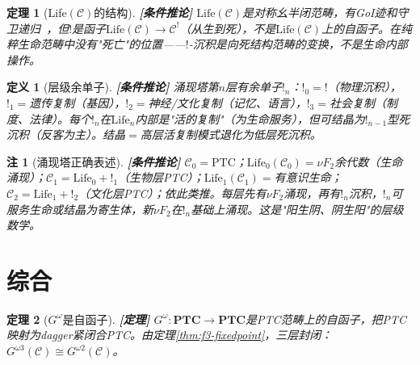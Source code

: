 \documentclass[11pt,a4paper]{article}
\newtheorem{definition}{定义}
\newtheorem{theorem}{定理}
\newtheorem{remark}{注}
\newcommand{\lvl}[1]{\hfill\textbf{\footnotesize[#1]}}
\newcommand{\lvP}{\lvl{定理}}
\newcommand{\lvC}{\lvl{条件推论}}
\newcommand{\bang}{{!}}
\begin{document}
\begin{theorem}[Life$(\mathcal{C})$的结构]\label{thm:life-structure}\lvC
$\mathrm{Life}(\mathcal{C})$是对称幺半闭范畴，有GoI迹和守卫递归~\cite{atkey13}，但$\bang$是函子$\mathrm{Life}(\mathcal{C})\to\mathcal{C}^!$（从生到死），不是$\mathrm{Life}(\mathcal{C})$上的自函子。在纯粹生命范畴中没有"死亡"的位置——$\bang$-沉积是向死结构范畴的变换，不是生命内部操作。
\end{theorem}

\begin{definition}[层级余单子]\label{def:hierarchical-comonad}\lvC
涌现塔第$n$层有余单子$\bang_n$：$\bang_0=\bang$（物理沉积），$\bang_1=$遗传复制（基因），$\bang_2=$神经/文化复制（记忆、语言），$\bang_3=$社会复制（制度、法律）。每个$\bang_n$在$\mathrm{Life}_n$内部是"活的复制"（为生命服务），但可结晶为$\bang_{n-1}$型死沉积（反客为主）。结晶$=$高层活复制模式退化为低层死沉积。
\end{definition}

\begin{remark}[涌现塔正确表述]\lvC
$\mathcal{C}_0=\mathrm{PTC}$；$\mathrm{Life}_0(\mathcal{C}_0)=\nu F_2$余代数（生命涌现）；$\mathcal{C}_1=\mathrm{Life}_0+\bang_1$（生物层PTC）；$\mathrm{Life}_1(\mathcal{C}_1)=$有意识生命；$\mathcal{C}_2=\mathrm{Life}_1+\bang_2$（文化层PTC）；依此类推。每层先有$\nu F_2$涌现，再有$\bang_n$沉积，$\bang_n$可服务生命或结晶为寄生体，新$\nu F_2$在$\bang_n$基础上涌现。这是"阳生阴、阴生阳"的层级数学。
\end{remark}

\section{综合}

\begin{theorem}[$G^\omega$是自函子]\label{thm:gomega-endofunctor}\lvP
$G^\omega:\mathbf{PTC}\to\mathbf{PTC}$是PTC范畴上的自函子，把PTC映射为dagger紧闭合PTC。由定理\ref{thm:f3-fixedpoint}，三层封闭：$G^{\omega 3}(\mathcal{C})\cong G^{\omega 2}(\mathcal{C})$。
\end{theorem}
\end{document}
